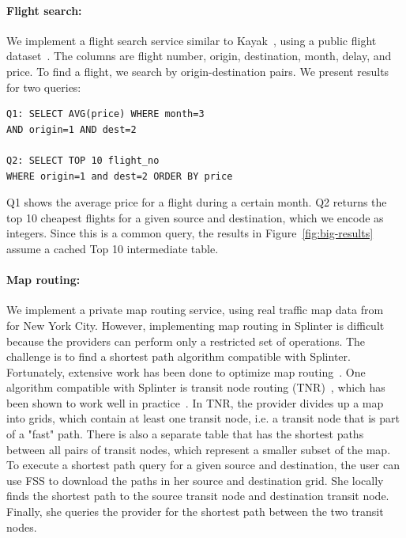 \paragraph{Flight search:}
We implement a flight search service similar to Kayak~\cite{kayak}, using 
a public flight dataset~\cite{enigma}. The columns
are flight number, origin, destination, month, delay, and price. To find a flight,
we search by origin-destination pairs. 
We present results for two queries:

\begin{verbatim}
Q1: SELECT AVG(price) WHERE month=3 
AND origin=1 AND dest=2

Q2: SELECT TOP 10 flight_no
WHERE origin=1 and dest=2 ORDER BY price
\end{verbatim}

Q1 shows the average price for a flight during a certain month.
Q2 returns the top 10 cheapest flights for a given source and destination, which 
we encode as integers.
Since this is a common query, the results in Figure~\ref{fig:big-results} 
assume a cached Top 10 intermediate table. 

\paragraph{Map routing:}
We implement a private map routing service, using real traffic map data from~\cite{dimacs} for New York City.
However, implementing map routing in Splinter is difficult because the providers can
perform only a restricted set of operations. The challenge is to find a shortest path 
algorithm compatible with Splinter. Fortunately,
extensive work has been done to optimize map routing~\cite{bast2015route}.
One algorithm compatible with Splinter is transit node routing 
(TNR)~\cite{tnr, bast2007fast}, which has been
shown to work well in practice~\cite{bast2009ultrafast}. 
In TNR, the provider divides up a map into grids, 
which contain at least one transit node, i.e. a transit node 
that is part of a "fast" path. There is also a separate table
that has the shortest paths between all pairs of transit nodes, which 
represent a smaller subset of the map. To execute a shortest path query for a given
source and destination, the user can use FSS to download the paths
in her source and destination grid. She locally finds the shortest path to the source transit node
and destination transit node. Finally, she queries the provider for the shortest path
between the two transit nodes.


